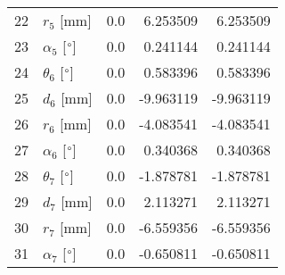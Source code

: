 \documentclass{standalone}%
\begin{document}
\begin{tabular}{llrrr}
22 &              $r_{5}$ [mm] &       0.0 &   6.253509 &   6.253509 \\
23 &  $\alpha_{5}$ [$\degree$] &       0.0 &   0.241144 &   0.241144 \\
24 &  $\theta_{6}$ [$\degree$] &       0.0 &   0.583396 &   0.583396 \\
25 &              $d_{6}$ [mm] &       0.0 &  -9.963119 &  -9.963119 \\
26 &              $r_{6}$ [mm] &       0.0 &  -4.083541 &  -4.083541 \\
27 &  $\alpha_{6}$ [$\degree$] &       0.0 &   0.340368 &   0.340368 \\
28 &  $\theta_{7}$ [$\degree$] &       0.0 &  -1.878781 &  -1.878781 \\
29 &              $d_{7}$ [mm] &       0.0 &   2.113271 &   2.113271 \\
30 &              $r_{7}$ [mm] &       0.0 &  -6.559356 &  -6.559356 \\
31 &  $\alpha_{7}$ [$\degree$] &       0.0 &  -0.650811 &  -0.650811 \\
\bottomrule
\end{tabular}
%
\end{document}
